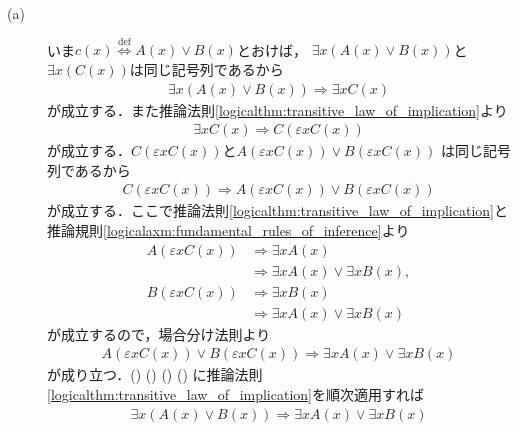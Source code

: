 	\begin{prf}\mbox{}
		\begin{description}
			\item[(a)]
				いま$c(x) \overset{\mathrm{def}}{\Longleftrightarrow} A(x) \vee B(x)$とおけば，
				$\exists x ( A(x) \vee B(x) )$と$\exists x ( C(x) )$は同じ記号列であるから
				\begin{align}
					\exists x ( A(x) \vee B(x) ) \Longrightarrow \exists x C(x)
					\label{eq:logicalthm_properties_of_quantifiers_1}
				\end{align}
				が成立する．また推論法則\ref{logicalthm:transitive_law_of_implication}より
				\begin{align}
					\exists x C(x) \Longrightarrow C(\varepsilon x C(x))
					\label{eq:logicalthm_properties_of_quantifiers_2}
				\end{align}
				が成立する．$C(\varepsilon x C(x))$と$A(\varepsilon x C(x)) \vee B(\varepsilon x C(x))$
				は同じ記号列であるから
				\begin{align}
					C(\varepsilon x C(x)) \Longrightarrow A(\varepsilon x C(x)) \vee B(\varepsilon x C(x))
					\label{eq:logicalthm_properties_of_quantifiers_3}
				\end{align}
				が成立する．ここで推論法則\ref{logicalthm:transitive_law_of_implication}と
				推論規則\ref{logicalaxm:fundamental_rules_of_inference}より
				\begin{align}
					A(\varepsilon x C(x)) &\Longrightarrow \exists x A(x) \\
						&\Longrightarrow \exists x A(x) \vee \exists x B(x), \\
					B(\varepsilon x C(x)) &\Longrightarrow \exists x B(x) \\
						&\Longrightarrow \exists x A(x) \vee \exists x B(x)
				\end{align}
				が成立するので，場合分け法則より
				\begin{align}
					A(\varepsilon x C(x)) \vee B(\varepsilon x C(x))
					\Longrightarrow \exists x A(x) \vee \exists x B(x)
					\label{eq:logicalthm_properties_of_quantifiers_4}
				\end{align}
				が成り立つ．()
				()
				()
				()
				に推論法則\ref{logicalthm:transitive_law_of_implication}を順次適用すれば
				\begin{align}
					\exists x ( A(x) \vee B(x) ) \Longrightarrow \exists x A(x) \vee \exists x B(x)

\end{align}
\end{description}
\end{prf}
